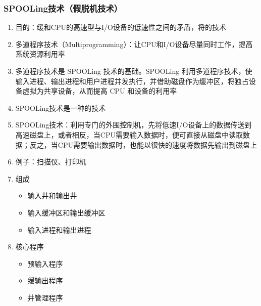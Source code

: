 \documentclass[./computer-organization-and-architecture.tex]{subfiles}
\begin{document}
    \subsubsection{SPOOLing技术（假脱机技术）}

    \begin{enumerate}
        \item 目的：缓和CPU的高速型与I/O设备的低速性之间的矛盾，将{\color{red}{独占设备改造成共享设备}}的技术
        \item 多道程序技术（Multiprogramming）：让CPU和I/O设备尽量同时工作，提高系统资源利用率
        \item 多道程序技术是 SPOOLing 技术的基础。SPOOLing 利用多道程序技术，使输入进程、输出进程和用户进程并发执行，并借助磁盘作为缓冲区，将独占设备虚拟为共享设备，从而提高 CPU 和设备的利用率
        \item SPOOLing技术是一种{\color{customgreen}{以空间换时间}}的技术
        \item SPOOLing技术：利用专门的外围控制机，先将低速I/O设备上的数据传送到高速磁盘上，或者相反，当CPU需要输入数据时，便可直接从磁盘中读取数据；反之，当CPU需要输出数据时，也能以很快的速度将数据先输出到磁盘上
        \item 例子：扫描仪、打印机
        \item 组成
        \begin{itemize}
            \item 输入井和输出井
            \item 输入缓冲区和输出缓冲区
            \item 输入进程和输出进程
        \end{itemize}
        \item 核心程序
        \begin{itemize}
            \item 预输入程序
            \item 缓输出程序
            \item 井管理程序
        \end{itemize}
    \end{enumerate}
\end{document}

